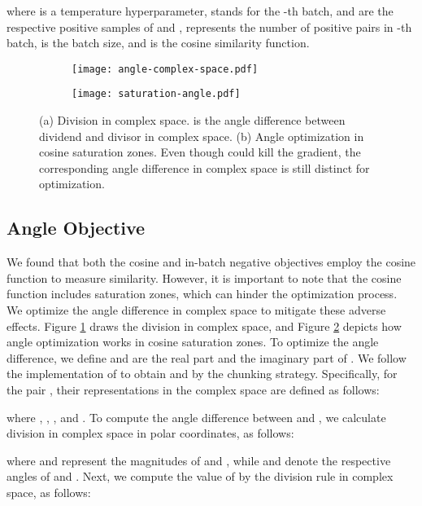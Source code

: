 \documentclass{article} \usepackage{iclr2024_conference,times}
\begin{document}
where  is a temperature hyperparameter,  stands for the -th batch,  and  are the respective positive samples of  and ,  represents the number of positive pairs in -th batch,  is the batch size, and  is the cosine similarity function.

\begin{figure}[ht]
     \centering
     \begin{subfigure}[b]{0.45\textwidth}
         \centering
         \texttt{[image: angle-complex-space.pdf]}
         \caption{}
         \label{angle-complex-space}
     \end{subfigure}
     \begin{subfigure}[b]{0.45\textwidth}
         \centering
         \texttt{[image: saturation-angle.pdf]}
         \caption{}
         \label{figure-saturation-angle}
     \end{subfigure}
    \caption{(a) Division in complex space.  is the angle difference between dividend  and divisor  in complex space. (b) Angle optimization in cosine saturation zones. Even though  could kill the gradient, the corresponding angle difference in complex space is still distinct for optimization.}
    \label{}
\end{figure}

\subsection{Angle Objective}
We found that both the cosine and in-batch negative objectives employ the cosine function to measure similarity. However, it is important to note that the cosine function includes saturation zones, which can hinder the optimization process. We optimize the angle difference in complex space to mitigate these adverse effects. Figure \ref{angle-complex-space} draws the division in complex space, and Figure \ref{figure-saturation-angle} depicts how angle optimization works in cosine saturation zones. To optimize the angle difference, we define  and  are the real part and the imaginary part of . We follow the implementation of \citep{sun2019rotate} to obtain  and  by the chunking strategy. Specifically, for the pair , their representations in the complex space are defined as follows:

where , , , and  .
To compute the angle difference between  and , we calculate division in complex space in polar coordinates, as follows:

where  and  represent the magnitudes of  and , while  and  denote the respective angles of  and . 
Next, we compute the value of  by the division rule in complex space, as follows:
\end{document}
